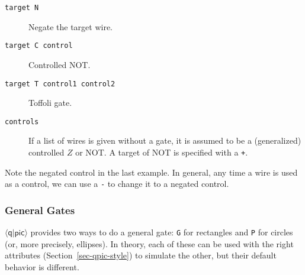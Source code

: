 \documentclass[twoside,12pt]{article}
\newcommand{\qpic}{$\langle\mathsf{q}|\mathsf{pic}\rangle$\xspace}
\begin{document}
\begin{description}
\item[{\tt target N}] Negate the target wire.

\begin{minipage}[b]{2in}

\end{minipage} \hfill 

\item[{\tt target C control}] Controlled NOT.

\begin{minipage}[b]{2in}

\end{minipage} \hfill 

\item[{\tt target T control1 control2}] Toffoli gate.

\begin{minipage}[b]{2in}

\end{minipage} \hfill 

\item[{\tt controls}]  If a list of wires is given without a gate, it is assumed to be a (generalized) controlled $Z$ or NOT.  A target of NOT is specified
  with a {\tt +}.

\begin{minipage}[b]{2in}

\end{minipage} \hfill 
\end{description}

Note the negated control in the last example.  In general, any time a wire is
used as a control, we can use a {\tt -} to change it to a negated control.

\subsubsection{General Gates}

\qpic provides two ways to do a general gate: {\tt G} for rectangles and
{\tt P} for circles (or, more precisely, ellipses).  In theory, each of these
can be used with the right attributes (Section~\ref{sec-qpic-style}) to
simulate the other, but their default behavior is different.
      
\end{document}
